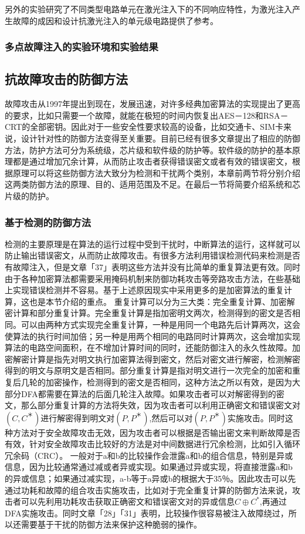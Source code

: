 \documentclass[a4paper,12pt]{article}
\begin{document}
\begin{CJK}{UTF8}{gkai}
另外的实验研究了不同类型电路单元在激光注入下的不同响应特性，为激光注入产生故障的成因和设计抗激光注入的单元级电路提供了参考。
\subsubsection{多点故障注入的实验环境和实验结果}
\subsection{抗故障攻击的防御方法}
故障攻击从1997年提出到现在，发展迅速，对许多经典加密算法的实现提出了更高的要求，比如只需要一个故障，就能在极短的时间内恢复出AES－128和RSA－CRT的全部密钥。因此对于一些安全性要求较高的设备，比如交通卡、SIM卡来说，设计针对性的防御方法变得至关重要。目前已经有很多文章提出了相应的防御方法，防护方法可分为系统级，芯片级和软件级的防护等。软件级的防护的基本原理都是通过增加冗余计算，从而防止攻击者获得错误密文或者有效的错误密文，根据原理可以将这些防御方法大致分为检测和干扰两个类别，本章前两节将分别介绍这两类防御方法的原理、目的、适用范围及不足。在最后一节将简要介绍系统和芯片级的防护。

\subsubsection{基于检测的防御方法}
检测的主要原理是在算法的运行过程中受到干扰时，中断算法的运行，这样就可以防止输出错误密文，从而防止故障攻击。有很多方法利用错误检测代码来检测是否有故障注入，但是文章「37」表明这些方法并没有比简单的重复算法更有效。同时由于各种加密算法都需要采用掩码机制来防御功耗攻击等旁路攻击方法，在些基础上实现错误检测并不容易。基于上述原因现实中采用更多的是加密算法的重复计算，这也是本节介绍的重点。
重复计算可以分为三大类：完全重复计算、加密解密计算和部分重复计算。完全重复计算是指加密明文两次，检测得到的密文是否相同。可以由两种方式实现完全重复计算，一种是用同一个电路先后计算两次，这会使算法的执行时间加倍；另一种是用两个相同的电路同时计算两次，这会增加实现算法的电路空间面积，在不增加计算时间的同时，还能防御注入的永久性故障。加密解密计算是指先对明文执行加密算法得到密文，然后对密文进行解密，检测解密得到的明文与原明文是否相同。部分重复计算是指对明文进行一次完全的加密和重复后几轮的加密操作，检测得到的密文是否相同，这种方法之所以有效，是因为大部分DFA都需要在算法的后面几轮注入故障。如果攻击者可以对解密得到的密文，那么部分重复计算的方法将失效，因为攻击者可以利用正确密文和错误密文对$(C,C^＊)$进行解密得到明文对$(P,P^＊)$,然后可以对$(P,P^＊)$实施攻击。同时这种方法对于安全故障攻击无效，因为攻击者可以根据是否输出密文来判断故障是否有效，针对安全故障攻击比较好的方法是对中间数据进行冗余检测，比如引入循环冗余码（CRC）。
一般对于a和b的比较操作会泄露a和b的组合信息，特别是异或信息，因为比较通常通过减或者异或实现。如果通过异或实现，将直接泄露a和b的异或信息；如果通过减实现，a-b等于a异或b的根据大于35％。因此攻击可以先通过功耗和故障的组合攻击实施攻击，比如对于完全重复计算的防御方法来说，攻击者可以先利用功耗攻击获取正确密文和错误密文对的异或信息$C \oplus C^*$,再通过DFA实施攻击。同时文章「28」「31」表明，比较操作很容易被注入故障绕过，所以还需要基于干扰的防御方法来保护这种脆弱的操作。


\end{CJK}
\end{document}
